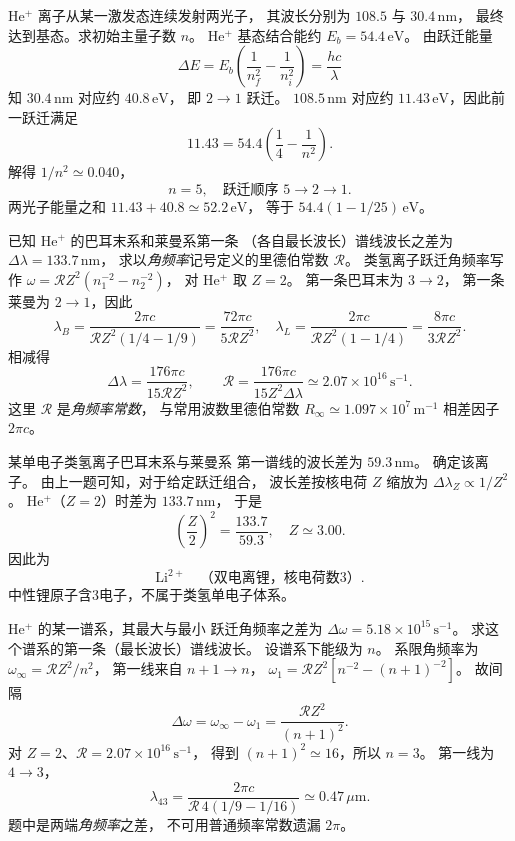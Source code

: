 He$^+$ 离子从某一激发态连续发射两光子，
其波长分别为 $108.5$ 与 $30.4\,\mathrm{nm}$，
最终达到基态。求初始主量子数 $n$。
\exsolution
He$^+$ 基态结合能约 $E_b=54.4\,\mathrm{eV}$。
由跃迁能量
\[
 \Delta E=E_b\left(\frac1{n_f^2}-\frac1{n_i^2}\right)
 =\frac{hc}{\lambda}
\]
知 $30.4\,\mathrm{nm}$ 对应约
$40.8\,\mathrm{eV}$，
即 $2\to1$ 跃迁。
$108.5\,\mathrm{nm}$ 对应约
$11.43\,\mathrm{eV}$，因此前一跃迁满足
\[
 11.43=54.4\left(\frac14-\frac1{n^2}\right).
\]
解得 $1/n^2\simeq0.040$，
\[
 \boxed{n=5},\quad
 \text{跃迁顺序 }5\to2\to1.
\]
\excheck 两光子能量之和
$11.43+40.8\simeq52.2\,\mathrm{eV}$，
等于 $54.4(1-1/25)\,\mathrm{eV}$。

已知 He$^+$ 的巴耳末系和莱曼系第一条
（各自最长波长）谱线波长之差为
$\Delta\lambda=133.7\,\mathrm{nm}$，
求以\emph{角频率}记号定义的里德伯常数
$\mathcal R$。
\exsolution
类氢离子跃迁角频率写作
$\omega=\mathcal R Z^2(n_1^{-2}-n_2^{-2})$，
对 He$^+$ 取 $Z=2$。
第一条巴耳末为 $3\to2$，
第一条莱曼为 $2\to1$，因此
\[
 \lambda_B=\frac{2\pi c}{\mathcal RZ^2(1/4-1/9)}
 =\frac{72\pi c}{5\mathcal RZ^2},
\quad
 \lambda_L=\frac{2\pi c}{\mathcal RZ^2(1-1/4)}
 =\frac{8\pi c}{3\mathcal RZ^2}.
\]
相减得
\[
 \Delta\lambda=\frac{176\pi c}{15\mathcal RZ^2},
 \qquad
 \boxed{\mathcal R=
 \frac{176\pi c}{15Z^2\Delta\lambda}
 \simeq2.07\times10^{16}\,\mathrm{s^{-1}}}.
\]
\excheck 这里 $\mathcal R$ 是\emph{角频率常数}，
与常用波数里德伯常数
$R_\infty\simeq1.097\times10^7\,\mathrm{m^{-1}}$
相差因子 $2\pi c$。

某单电子类氢离子巴耳末系与莱曼系
第一谱线的波长差为 $59.3\,\mathrm{nm}$。
确定该离子。
\exsolution
由上一题可知，对于给定跃迁组合，
波长差按核电荷 $Z$ 缩放为
$\Delta\lambda_Z\propto1/Z^2$。
He$^+$（$Z=2$）时差为 $133.7\,\mathrm{nm}$，
于是
\[
 \left(\frac Z2\right)^2=
 \frac{133.7}{59.3},\quad
 Z\simeq3.00.
\]
因此为
\[
 \boxed{\mathrm{Li}^{2+}
 \quad\text{（双电离锂，核电荷数3）}}.
\]
\excheck 中性锂原子含3电子，不属于类氢单电子体系。

He$^+$ 的某一谱系，其最大与最小
跃迁角频率之差为
$\Delta\omega=5.18\times10^{15}\,\mathrm{s^{-1}}$。
求这个谱系的第一条（最长波长）谱线波长。
\exsolution
设谱系下能级为 $n$。
系限角频率为
$\omega_\infty=\mathcal R Z^2/n^2$，
第一线来自 $n+1\to n$，
$\omega_1=\mathcal RZ^2[n^{-2}-(n+1)^{-2}]$。
故间隔
\[
 \Delta\omega=\omega_\infty-\omega_1
 =\frac{\mathcal R Z^2}{(n+1)^2}.
\]
对 $Z=2$、$\mathcal R=2.07\times10^{16}\,\mathrm{s^{-1}}$，
得到 $(n+1)^2\simeq16$，所以 $n=3$。
第一线为 $4\to3$，
\[
 \boxed{\lambda_{43}=
 \frac{2\pi c}{\mathcal R\,4(1/9-1/16)}
 \simeq0.47\,\mu\mathrm m}.
\]
\excheck 题中是两端\emph{角频率}之差，
不可用普通频率常数遗漏 $2\pi$。

